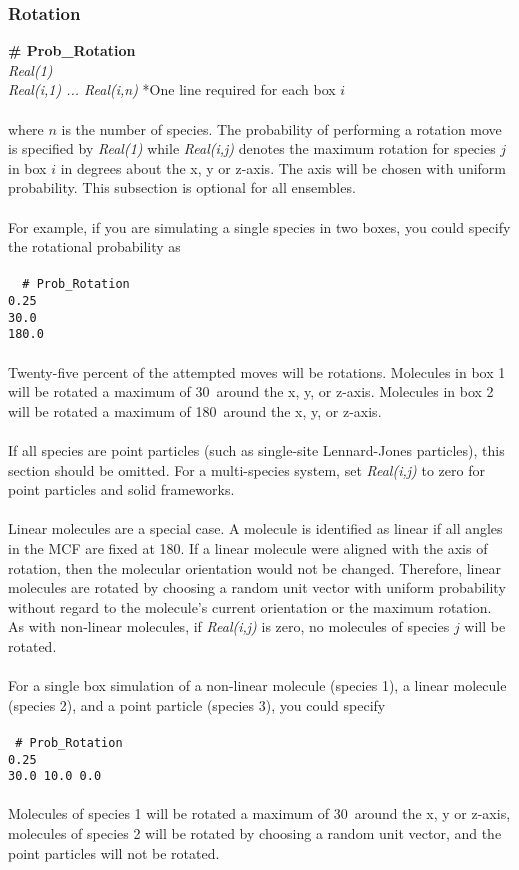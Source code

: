 \subsubsection{Rotation}
{\bf \# Prob\_Rotation}\\
{\it Real(1)} \\
{\it Real(i,1) ... Real(i,n)} *One line required for each box $i$ \\ \\
%
where $n$ is the number of species.
The probability of performing a rotation move is specified by
{\it Real(1)} while {\it Real(i,j)} denotes the maximum rotation
for species $j$ in box $i$ in degrees about the x, y or z-axis.
The axis will be chosen with uniform probability.
This subsection is optional for all ensembles. \\ \\
%
For example, if you are simulating a single species in two boxes,
you could specify the rotational probability as \\ \\
\texttt{
{ \# Prob\_Rotation} \\
 0.25 \\
30.0\\
180.0} \\ \\
%
Twenty-five percent of the attempted moves will be rotations.
Molecules in box 1 will be rotated a maximum of 30\degree\ around the x, y, or z-axis.
Molecules in box 2 will be rotated a maximum of 180\degree\ around the x, y, or z-axis. \\ \\
%
If all species are point particles (such as single-site Lennard-Jones particles),
this section should be omitted.
For a multi-species system,
set {\it Real(i,j)} to zero for point particles and solid frameworks. \\ \\
%
Linear molecules are a special case.
A molecule is identified as linear if all angles in the MCF are fixed at 180\degree .
If a linear molecule were aligned with the axis of rotation,
then the molecular orientation would not be changed.
Therefore, linear molecules are rotated by choosing a random unit vector with uniform probability
without regard to the molecule's current orientation or the maximum rotation.
As with non-linear molecules, if {\it Real(i,j)} is zero, no molecules of species $j$ will be rotated. \\ \\
%
For a single box simulation of a non-linear molecule (species 1), a linear molecule (species 2),
and a point particle (species 3), you could specify \\ \\
%
\texttt{
{\# Prob\_Rotation} \\
 0.25 \\
30.0 10.0 0.0} \\ \\
%
Molecules of species 1 will be rotated a maximum of 30\degree\ around the x, y or z-axis,
molecules of species 2 will be rotated by choosing a random unit vector, and
the point particles will not be rotated.
%
%
%
